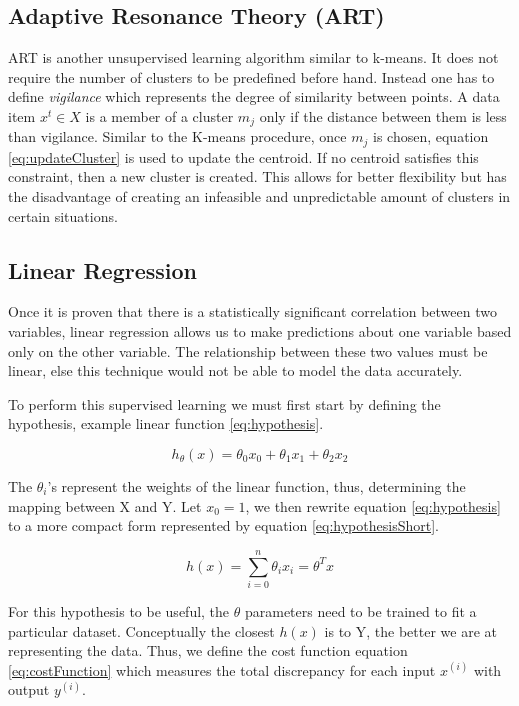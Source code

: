 \documentclass{mproj}
\begin{document}
\subsection{Adaptive Resonance Theory (ART)}
\label{sec:artExplanation}
ART \cite{art} is another unsupervised learning algorithm similar to k-means. It does not require the number of clusters to be predefined before hand. Instead one has to define \textit{vigilance} which represents the degree of similarity between points. A data item $x^t \in X$ is a member of a cluster $m_j$ only if the distance between them is less than vigilance. Similar to the K-means procedure, once $m_j$ is chosen, equation \ref{eq:updateCluster} is used to update the centroid. If no centroid satisfies this constraint, then a new cluster is created. This allows for better flexibility but has the disadvantage of creating an infeasible and unpredictable amount of clusters in certain situations.

\subsection{Linear Regression}
\label{linearregression}
Once it is proven that there is a statistically significant correlation between two variables, linear regression allows us to make predictions about one variable based only on the other variable. The relationship between these two values must be linear, else this technique would not be able to model the data accurately.

To perform this supervised learning we must first start by defining the hypothesis, example linear function \ref{eq:hypothesis}.

\begin{equation}
\label{eq:hypothesis}
h_\theta(x) = \theta_0x_0 + \theta_1x_1 + \theta_2x_2
\end{equation}

The $\theta_i$'s represent the weights of the linear function, thus, determining the mapping between X and Y. Let $x_0=1$, we then rewrite equation \ref{eq:hypothesis} to a more compact form represented by equation \ref{eq:hypothesisShort}.

\begin{equation}
\label{eq:hypothesisShort}
h(x) = \sum_{i=0}^{n} \theta_ix_i = \theta^Tx
\end{equation}

For this hypothesis to be useful, the $\theta$ parameters need to be trained to fit a particular dataset. Conceptually the closest $h(x)$ is to Y, the better we are at representing the data. Thus, we define the cost function equation \ref{eq:costFunction} which measures the total discrepancy for each input $x^{(i)}$ with output $y^{(i)}$.
\end{document}
